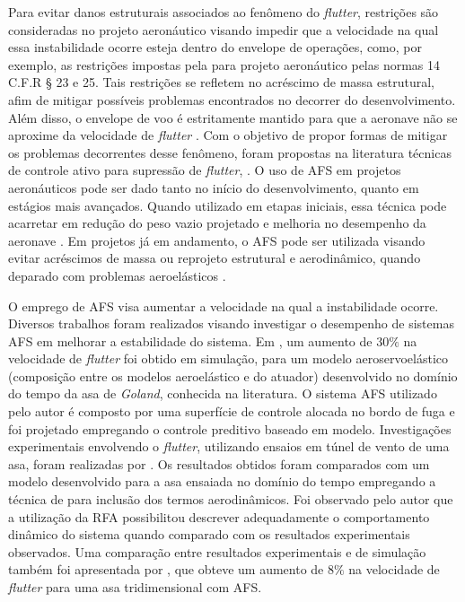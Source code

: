 Para evitar danos estruturais associados ao fenômeno do \textit{flutter}, restrições são consideradas no projeto aeronáutico visando impedir que a velocidade na qual essa instabilidade ocorre esteja dentro do envelope de operações, como, por exemplo, as restrições impostas pela  para projeto aeronáutico pelas normas 14 C.F.R § 23 e 25. Tais restrições se refletem no acréscimo de massa estrutural, afim de mitigar possíveis problemas encontrados no decorrer do desenvolvimento. Além disso, o envelope de voo é estritamente mantido para que a aeronave não se aproxime da velocidade de \textit{flutter} \cite{art:Sun-2014}. Com o objetivo de propor formas de mitigar os problemas decorrentes desse fenômeno, foram propostas na literatura técnicas de controle ativo para supressão de \textit{flutter}, . O uso de \gls{AFS} em projetos aeronáuticos pode ser dado tanto no início do desenvolvimento, quanto em estágios mais avançados. Quando utilizado em etapas iniciais, essa técnica pode acarretar em redução do peso vazio projetado e melhoria no desempenho da aeronave \cite{art:Livne-1999}. Em projetos já em andamento, o \gls{AFS} pode ser utilizada visando evitar acréscimos de massa ou reprojeto estrutural e aerodinâmico, quando deparado com problemas aeroelásticos \cite{art:Livne-2018}.

O emprego de \gls{AFS} visa aumentar a velocidade na qual a instabilidade ocorre. Diversos trabalhos foram realizados visando investigar o desempenho de sistemas \gls{AFS} em melhorar a estabilidade do sistema. Em \textcite{art:Sun-2014}, um aumento de $30\%$ na velocidade de \textit{flutter} foi obtido em simulação, para um modelo aeroservoelástico (composição entre os modelos aeroelástico e do atuador) desenvolvido no domínio do tempo da asa de \textit{Goland}, conhecida na literatura. O sistema \gls{AFS} utilizado pelo autor é composto por uma superfície de controle alocada no bordo de fuga e foi projetado empregando o controle preditivo baseado em modelo. Investigações experimentais envolvendo o \textit{flutter}, utilizando ensaios em túnel de vento de uma asa, foram realizadas por \textcite{art:NASA1367}. Os resultados obtidos foram comparados com um modelo desenvolvido para a asa ensaiada no domínio do tempo empregando a técnica de  para inclusão dos termos aerodinâmicos. Foi observado pelo autor que a utilização da RFA possibilitou descrever adequadamente o comportamento dinâmico do sistema quando comparado com os resultados experimentais observados. Uma comparação entre resultados experimentais e de simulação também foi apresentada por \textcite{art:Huang-2015}, que obteve um aumento de $8\%$ na velocidade de \textit{flutter} para uma asa tridimensional com \gls{AFS}.

